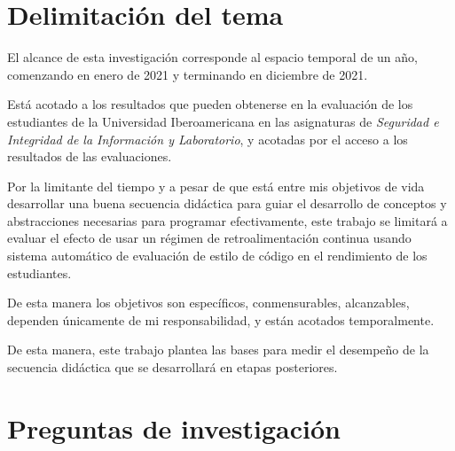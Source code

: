 \documentclass[
  12,
]{scrartcl}
\begin{document}
\hypertarget{delimitaciuxf3n-del-tema}{%
\section{Delimitación del tema}\label{delimitaciuxf3n-del-tema}}

El alcance de esta investigación corresponde al espacio temporal de un
año, comenzando en enero de 2021 y terminando en diciembre de 2021.

Está acotado a los resultados que pueden obtenerse en la evaluación de
los estudiantes de la Universidad Iberoamericana en las asignaturas de
\emph{Seguridad e Integridad de la Información y Laboratorio}, y
acotadas por el acceso a los resultados de las evaluaciones.

Por la limitante del tiempo y a pesar de que está entre mis objetivos de
vida desarrollar una buena secuencia didáctica para guiar el desarrollo
de conceptos y abstracciones necesarias para programar efectivamente,
este trabajo se limitará a evaluar el efecto de usar un régimen de
retroalimentación continua usando sistema automático de evaluación de
estilo de código en el rendimiento de los estudiantes.

De esta manera los objetivos son específicos, conmensurables,
alcanzables, dependen únicamente de mi responsabilidad, y están acotados
temporalmente.

De esta manera, este trabajo plantea las bases para medir el desempeño
de la secuencia didáctica que se desarrollará en etapas posteriores.

\hypertarget{preguntas-de-investigaciuxf3n}{%
\section{Preguntas de
investigación}\label{preguntas-de-investigaciuxf3n}}
\end{document}
